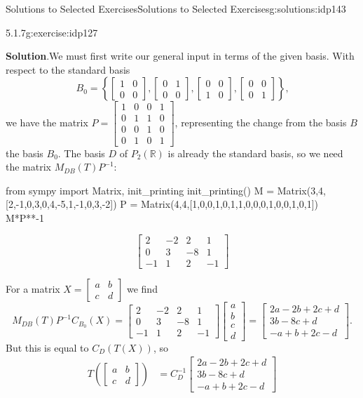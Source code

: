 \documentclass[oneside,10pt,]{book}
\newcommand{\blocktitlefont}{\relax}
\numberwithin{equation}{section}
\newcommand{\bbm}{\begin{bmatrix}}
\newcommand{\ebm}{\end{bmatrix}}
\newcommand{\R}{\mathbb{R}}
\newcommand{\amp}{&}
\begin{document}
\begin{solutions-chapter}{Solutions to Selected Exercises}{}{Solutions to Selected Exercises}{}{}{g:solutions:idp143}
\begin{inlinesolution}{5.1.7}{}{g:exercise:idp127}
\par\smallskip%
\noindent\textbf{\blocktitlefont Solution}.\hypertarget{g:solution:idp177-back}{}\quad{}We must first write our general input in terms of the given basis. With respect to the standard basis%
\begin{equation*}
B_0 = \left\{\bbm 1\amp 0\\0\amp 0\ebm, \bbm 0\amp 1\\0\amp 0\ebm, \bbm 0\amp 0\\1\amp 0\ebm, \bbm 0\amp 0\\0\amp 1\ebm\right\}\text{,}
\end{equation*}
we have the matrix \(P = \bbm 1\amp 0\amp 0\amp 1\\0\amp 1\amp 1\amp 0\\0\amp 0\amp 1\amp 0\\0\amp 1\amp 0\amp 1\ebm\), representing the change from the basis \(B\) the basis \(B_0\). The basis \(D\) of \(P_2(\R)\) is already the standard basis, so we need the matrix \(M_{DB}(T)P^{-1}\):%
\begin{sageinput}
from sympy import Matrix, init_printing
init_printing()
M = Matrix(3,4,[2,-1,0,3,0,4,-5,1,-1,0,3,-2])
P = Matrix(4,4,[1,0,0,1,0,1,1,0,0,0,1,0,0,1,0,1])
M*P**-1
\end{sageinput}
\begin{sageoutput}
\[\bbm 2\amp -2\amp 2\amp 1\\0\amp 3\amp -8\amp 1\\-1\amp 1\amp 2\amp -1\ebm\]
\end{sageoutput}
For a matrix \(X = \bbm a\amp b\\c\amp d\ebm\) we find%
\begin{equation*}
M_{DB}(T)P^{-1}C_{B_0}(X)=\bbm 2\amp -2\amp 2\amp 1\\0\amp 3\amp -8\amp 1\\-1\amp 1\amp 2\amp -1\ebm\bbm a\\b\\c\\d\ebm =
\bbm 2a-2b+2c+d\\3b-8c+d\\-a+b+2c-d\ebm\text{.}
\end{equation*}
But this is equal to \(C_D(T(X))\), so%
\begin{align*}
T\left(\bbm a\amp b\\c\amp d\ebm\right) \amp = C_D^{-1}\bbm 2a-2b+2c+d\\3b-8c+d\\-a+b+2c-d\ebm\\

\end{align*}
\end{inlinesolution}
\end{solutions-chapter}
\end{document}
